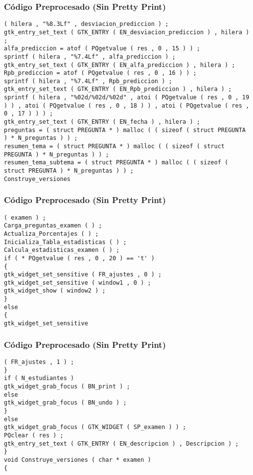 \documentclass{beamer}
\begin{document}
\begin{frame}[fragile]
\frametitle{C\'odigo Preprocesado (Sin Pretty Print)}
\begin{lstlisting}[style=CStyle]
( hilera , "%8.3Lf" , desviacion_prediccion ) ; 
gtk_entry_set_text ( GTK_ENTRY ( EN_desviacion_prediccion ) , hilera ) ; 
alfa_prediccion = atof ( PQgetvalue ( res , 0 , 15 ) ) ; 
sprintf ( hilera , "%7.4Lf" , alfa_prediccion ) ; 
gtk_entry_set_text ( GTK_ENTRY ( EN_alfa_prediccion ) , hilera ) ; 
Rpb_prediccion = atof ( PQgetvalue ( res , 0 , 16 ) ) ; 
sprintf ( hilera , "%7.4Lf" , Rpb_prediccion ) ; 
gtk_entry_set_text ( GTK_ENTRY ( EN_Rpb_prediccion ) , hilera ) ; 
sprintf ( hilera , "%02d/%02d/%02d" , atoi ( PQgetvalue ( res , 0 , 19 ) ) , atoi ( PQgetvalue ( res , 0 , 18 ) ) , atoi ( PQgetvalue ( res , 0 , 17 ) ) ) ; 
gtk_entry_set_text ( GTK_ENTRY ( EN_fecha ) , hilera ) ; 
preguntas = ( struct PREGUNTA * ) malloc ( ( sizeof ( struct PREGUNTA ) * N_preguntas ) ) ; 
resumen_tema = ( struct PREGUNTA * ) malloc ( ( sizeof ( struct PREGUNTA ) * N_preguntas ) ) ; 
resumen_tema_subtema = ( struct PREGUNTA * ) malloc ( ( sizeof ( struct PREGUNTA ) * N_preguntas ) ) ; 
Construye_versiones \end{lstlisting}
\end{frame}
\begin{frame}[fragile]
\frametitle{C\'odigo Preprocesado (Sin Pretty Print)}
\begin{lstlisting}[style=CStyle]
( examen ) ; 
Carga_preguntas_examen ( ) ; 
Actualiza_Porcentajes ( ) ; 
Inicializa_Tabla_estadisticas ( ) ; 
Calcula_estadisticas_examen ( ) ; 
if ( * PQgetvalue ( res , 0 , 20 ) == 't' ) 
{ 
gtk_widget_set_sensitive ( FR_ajustes , 0 ) ; 
gtk_widget_set_sensitive ( window1 , 0 ) ; 
gtk_widget_show ( window2 ) ; 
} 
else 
{ 
gtk_widget_set_sensitive \end{lstlisting}
\end{frame}
\begin{frame}[fragile]
\frametitle{C\'odigo Preprocesado (Sin Pretty Print)}
\begin{lstlisting}[style=CStyle]
( FR_ajustes , 1 ) ; 
} 
if ( N_estudiantes ) 
gtk_widget_grab_focus ( BN_print ) ; 
else 
gtk_widget_grab_focus ( BN_undo ) ; 
} 
else 
gtk_widget_grab_focus ( GTK_WIDGET ( SP_examen ) ) ; 
PQclear ( res ) ; 
gtk_entry_set_text ( GTK_ENTRY ( EN_descripcion ) , Descripcion ) ; 
} 
void Construye_versiones ( char * examen ) 
{ \end{lstlisting}
\end{frame}
\end{document}
